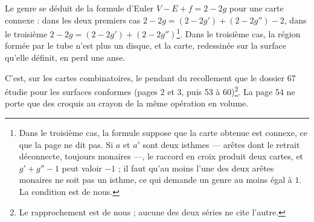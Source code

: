 \documentclass[11pt,a4paper]{article}
\begin{document}
Le genre se déduit de la formule d'Euler $V - E + f = 2 - 2g$ pour une carte
connexe : dans les deux premiers cas $2 - 2g = (2 - 2g') + (2 - 2g'') - 2$,
dans le troisième $2 - 2g = (2 - 2g') + (2 - 2g'')$\footnote{Dans le
troisième cas, la formule suppose que la carte obtenue est connexe, ce que
la page ne dit pas. Si $a$ et $a'$ sont deux isthmes --- arêtes dont le
retrait déconnecte, toujours monaires ---, le raccord en croix produit deux
cartes, et $g' + g'' - 1$ peut valoir $-1$ ; il faut qu'au moins l'une des
deux arêtes monaires ne soit pas un isthme, ce qui demande un genre au moins
égal à $1$. La condition est de nous.}. Dans le troisième cas, la région
formée par le tube n'est plus un disque, et la carte, redessinée sur la
surface qu'elle définit, en perd une anse.

C'est, sur les cartes combinatoires, le pendant du recollement que le
dossier 67 étudie pour les surfaces conformes (pages 2 et 3, puis 53 à
60)\footnote{Le rapprochement est de nous ; aucune des deux séries ne cite
l'autre.}. La page 54 ne porte que des croquis au crayon de la même
opération en volume.
\end{document}
